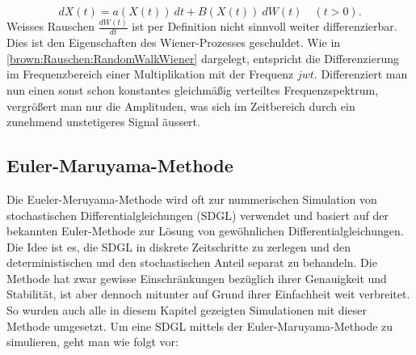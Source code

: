\begin{equation}
	dX(t) = a(X(t)) \ dt + B(X(t)) \ dW(t) \quad (t>0).
\end{equation}
Weisses Rauschen $ \frac{dW(t)}{dt} $ ist per Definition nicht sinnvoll weiter differenzierbar. Dies ist den Eigenschaften des Wiener-Prozesses geschuldet. Wie in \ref{brown:Rauschen:RandomWalkWiener} dargelegt, entspricht die Differenzierung im Frequenzbereich einer Multiplikation mit der Frequenz $ jwt $. Differenziert man nun einen sonst schon konstantes gleichmäßig verteiltes Frequenzspektrum, vergrößert man nur die Amplituden, was sich im Zeitbereich durch ein zunehmend unstetigeres Signal äussert.



\subsection{Euler-Maruyama-Methode\label{brown:Simulation}}

Die Eueler-Meruyama-Methode wird oft zur nummerischen Simulation von stochastischen Differentialgleichungen (SDGL) verwendet und basiert auf der bekannten Euler-Methode zur Lösung von gewöhnlichen Differentialgleichungen. Die Idee ist es, die SDGL in diskrete Zeitschritte zu zerlegen und den deterministischen und den stochastischen Anteil separat zu behandeln. Die Methode hat zwar gewisse Einschränkungen bezüglich ihrer Genauigkeit und Stabilität, ist aber dennoch mitunter auf Grund ihrer Einfachheit weit verbreitet. \cite{Bayram2018} So wurden auch alle in diesem Kapitel gezeigten Simulationen mit dieser Methode umgesetzt. Um eine SDGL mittels der Euler-Maruyama-Methode zu simulieren, geht man wie folgt vor:




